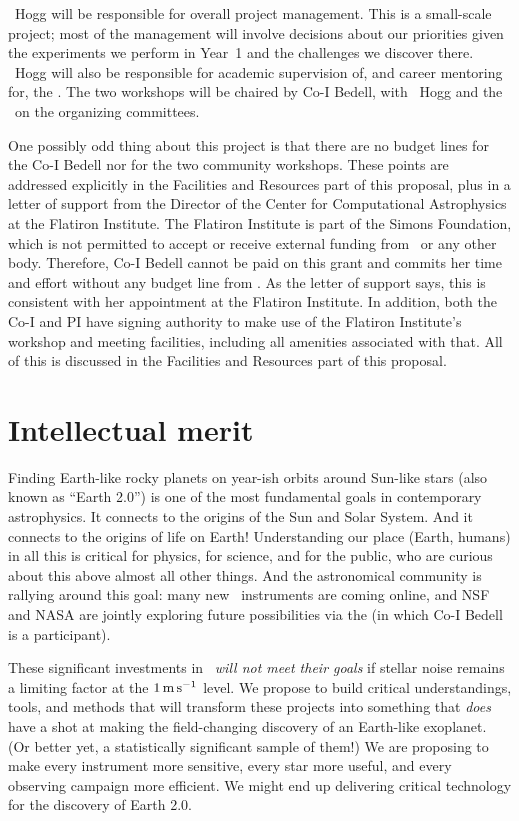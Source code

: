 \documentclass[12pt, letterpaper]{article}
\begin{document}
\PI\ Hogg will be responsible for overall project management. This is a
small-scale project; most of the management will involve decisions about our
priorities given the experiments we perform in Year~1 and the
challenges we discover there.
\PI\ Hogg will also be responsible for academic supervision of, and
career mentoring for, the \GRA.
The two workshops will be chaired by Co-I Bedell, with \PI\ Hogg and
the \GRA\ on the organizing committees.

One possibly odd thing about this project is that there are no budget lines for
the Co-I Bedell nor for the two community workshops.
These points are addressed explicitly in the Facilities and Resources part of this
proposal, plus in a letter of support from the Director of the Center for Computational
Astrophysics at the Flatiron Institute.
The Flatiron Institute is part of the Simons Foundation, which is not permitted to
accept or receive external funding from \NSF\ or any other body.
Therefore, Co-I Bedell cannot be paid on this grant and commits her time and
effort without any budget line from \NSF.
As the letter of support says, this is consistent with her appointment at the Flatiron
Institute.
In addition, both the Co-I and PI have signing authority to make use of
the Flatiron Institute's workshop and meeting facilities, including all amenities
associated with that.
All of this is discussed in the Facilities and Resources part of this proposal.

\section{Intellectual merit}

Finding Earth-like rocky planets on year-ish orbits
around Sun-like stars (also known as ``Earth 2.0'') is one of the most fundamental goals
in contemporary astrophysics.
It connects to the origins of the Sun and Solar System.
And it connects to the origins of life on Earth!
Understanding our place (Earth, humans) in all this is critical for physics, for science, and for the
public, who are curious about this above almost all other things.
And the astronomical community is rallying around this goal: many new \EPRV\ instruments 
are coming online, and NSF and NASA are jointly exploring future possibilities via the 
 (in which Co-I Bedell is a participant).

These significant investments in \EPRV\ \textit{will not meet their goals} if
stellar noise remains a limiting factor at the $1\,{\mathrm{m\,s^{-1}}}$ level. 
We propose to build critical understandings, tools, and methods that will transform
these projects into something that \textit{does} have a shot at making the field-changing 
discovery of an Earth-like exoplanet. (Or better yet, a statistically significant sample of them!) 
We are proposing to make every instrument more sensitive, every star more useful,
and every observing campaign more efficient.
We might end up delivering critical technology for the discovery of Earth 2.0.
\end{document}
